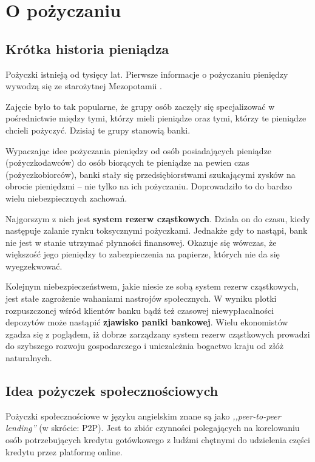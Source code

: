 \documentclass[a4paper,twoside,titlepage,openright]{book}
\begin{document}
\clearpage{\pagestyle{empty}\cleardoublepage}
\chapter{O pożyczaniu}
\section{Krótka historia pieniądza}
Pożyczki istnieją od tysięcy lat. Pierwsze informacje o pożyczaniu pieniędzy wywodzą się ze starożytnej Mezopotamii \cite{financingCivilization}. 

Zajęcie było to tak popularne, że grupy osób zaczęły się specjalizować w pośrednictwie między tymi, którzy mieli pieniądze oraz tymi, którzy te pieniądze chcieli pożyczyć. Dzisiaj te grupy stanowią banki. 

Wypaczając idee pożyczania pieniędzy od osób posiadających pieniądze (pożyczkodawców) do osób biorących te pieniądze na pewien czas (pożyczkobiorców), banki stały się przedsiębiorstwami szukającymi zysków na obrocie pieniędzmi -- nie tylko na ich pożyczaniu. Doprowadziło to do bardzo wielu niebezpiecznych zachowań. 

Najgorszym z nich jest \textbf{system rezerw cząstkowych}. Działa on do czasu, kiedy następuje zalanie rynku toksycznymi pożyczkami. Jednakże gdy to nastąpi, bank nie jest w stanie utrzymać płynności finansowej. Okazuje się wówczas, że większość jego pieniędzy to zabezpieczenia na papierze, których nie da się wyegzekwować. 

Kolejnym niebezpieczeństwem, jakie niesie ze sobą system rezerw cząstkowych, jest stałe zagrożenie wahaniami nastrojów społecznych. W wyniku plotki rozpuszczonej wśród klientów banku bądź też czasowej niewypłacalności depozytów może nastąpić \textbf{zjawisko paniki bankowej}. Wielu ekonomistów zgadza się z poglądem, iż dobrze zarządzany system rezerw cząstkowych prowadzi do szybszego rozwoju gospodarczego i uniezależnia bogactwo kraju od złóż naturalnych.\cite{fractionalReserveBanking}

\section{Idea pożyczek społecznościowych}
Pożyczki społecznościowe w języku angielskim znane są jako \textit{,,peer-to-peer lending''} (w skrócie: P2P). Jest to zbiór czynności polegających na korelowaniu osób potrzebujących kredytu gotówkowego z ludźmi chętnymi do udzielenia części kredytu przez platformę online.\cite{P2P} 
\end{document}

